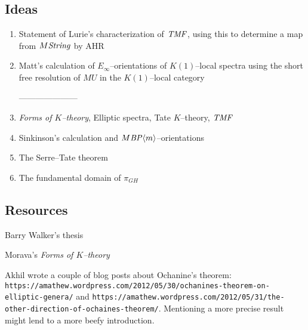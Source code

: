 \documentclass[12pt]{book}
\begin{document}
\subsection*{Ideas}
\begin{enumerate}
\item Statement of Lurie's characterization of $\mathit{TMF}$, using this to determine a map from $M\mathit{String}$ by AHR
\item Matt's calculation of $E_\infty$--orientations of $K(1)$--local spectra using the short free resolution of $MU$ in the $K(1)$--local category

---------------------
\item \textit{Forms of $K$--theory}, Elliptic spectra, Tate $K$--theory, $\mathit{TMF}$
\item Sinkinson's calculation and $M\mathit{BP}\langle m\rangle$--orientations
\item The Serre--Tate theorem
\item The fundamental domain of $\pi_{GH}$
\end{enumerate}


\subsection*{Resources}

Barry Walker's thesis

Morava's \textit{Forms of $K$--theory}

Akhil wrote a couple of blog posts about Ochanine's theorem: \texttt{https://amathew.wordpress.com/2012/05/30/ochanines-theorem-on-elliptic-genera/} and \texttt{https://amathew.wordpress.com/2012/05/31/the-other-direction-of-ochaines-theorem/}. Mentioning a more precise result might lend to a more beefy introduction.
\end{document}
